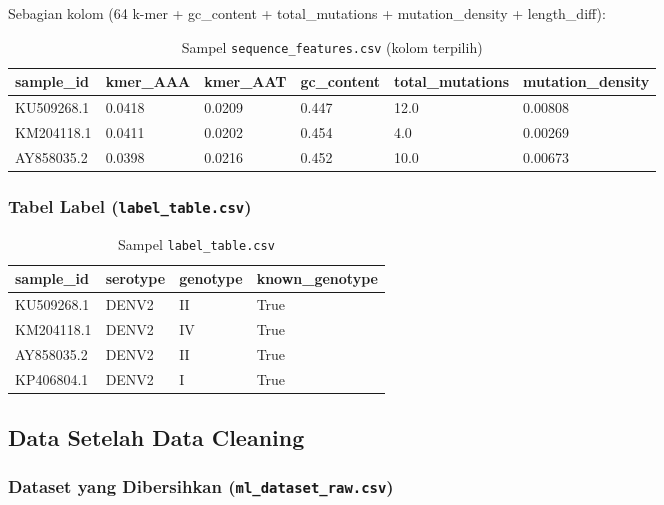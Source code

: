 \documentclass[12pt,a4paper]{article}
\begin{document}
Sebagian kolom (64 k-mer + gc\_content + total\_mutations + mutation\_density + length\_diff):

\begin{table}[h]
\centering
\caption{Sampel \texttt{sequence\_features.csv} (kolom terpilih)}
\small
\begin{tabular}{@{}llllll@{}}
\toprule
\textbf{sample\_id} & \textbf{kmer\_AAA} & \textbf{kmer\_AAT} & \textbf{gc\_content} & \textbf{total\_mutations} & \textbf{mutation\_density} \\
\midrule
KU509268.1 & 0.0418 & 0.0209 & 0.447 & 12.0 & 0.00808 \\
KM204118.1 & 0.0411 & 0.0202 & 0.454 & 4.0 & 0.00269 \\
AY858035.2 & 0.0398 & 0.0216 & 0.452 & 10.0 & 0.00673 \\
\bottomrule
\end{tabular}
\end{table}

\subsubsection{Tabel Label (\texttt{label\_table.csv})}

\begin{table}[h]
\centering
\caption{Sampel \texttt{label\_table.csv}}
\small
\begin{tabular}{@{}llll@{}}
\toprule
\textbf{sample\_id} & \textbf{serotype} & \textbf{genotype} & \textbf{known\_genotype} \\
\midrule
KU509268.1 & DENV2 & II & True \\
KM204118.1 & DENV2 & IV & True \\
AY858035.2 & DENV2 & II & True \\
KP406804.1 & DENV2 & I & True \\
\bottomrule
\end{tabular}
\end{table}

\subsection{Data Setelah Data Cleaning}

\subsubsection{Dataset yang Dibersihkan (\texttt{ml\_dataset\_raw.csv})}
\end{document}
